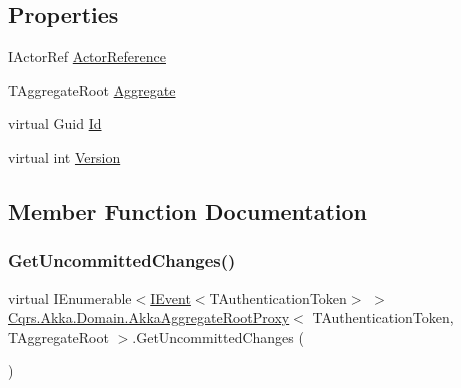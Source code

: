\subsection*{Properties}
\begin{DoxyCompactItemize}
\item 
I\+Actor\+Ref \hyperlink{classCqrs_1_1Akka_1_1Domain_1_1AkkaAggregateRootProxy_ad85e7a51c716484df8e5e8ea9ff31351}{Actor\+Reference}
\item 
T\+Aggregate\+Root \hyperlink{classCqrs_1_1Akka_1_1Domain_1_1AkkaAggregateRootProxy_a45e41e24822f4a9a8077e10c153de163}{Aggregate}
\item 
virtual Guid \hyperlink{classCqrs_1_1Akka_1_1Domain_1_1AkkaAggregateRootProxy_a7854104312b6088a2c604b334433b633}{Id}
\item 
virtual int \hyperlink{classCqrs_1_1Akka_1_1Domain_1_1AkkaAggregateRootProxy_a24ff2ddef0d416ac5b936c1887ac2154}{Version}
\end{DoxyCompactItemize}


\subsection{Member Function Documentation}
\mbox{\label{classCqrs_1_1Akka_1_1Domain_1_1AkkaAggregateRootProxy_afa620ced4762b0539da23ca063fed489}} 
\subsubsection{\texorpdfstring{Get\+Uncommitted\+Changes()}{GetUncommittedChanges()}}
{\footnotesize\ttfamily virtual I\+Enumerable$<$\hyperlink{interfaceCqrs_1_1Events_1_1IEvent}{I\+Event}$<$T\+Authentication\+Token$>$ $>$ \hyperlink{classCqrs_1_1Akka_1_1Domain_1_1AkkaAggregateRootProxy}{Cqrs.\+Akka.\+Domain.\+Akka\+Aggregate\+Root\+Proxy}$<$ T\+Authentication\+Token, T\+Aggregate\+Root $>$.Get\+Uncommitted\+Changes (\begin{DoxyParamCaption}{ }\end{DoxyParamCaption})\hspace{0.3cm}{\ttfamily [virtual]}}



